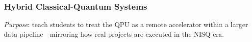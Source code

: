 
\subsubsection{Hybrid Classical-Quantum Systems}

\emph{Purpose}: teach students to treat the QPU as a remote accelerator within 
a larger data pipeline—mirroring how real projects are executed in the NISQ era.






